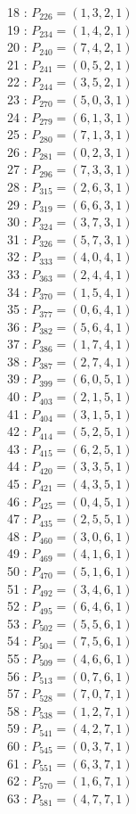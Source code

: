 \documentclass{article}
\begin{document}
{\begin{multicols}{2}
18 : $P_{226}=( 1, 3, 2, 1 )$\\
19 : $P_{234}=( 1, 4, 2, 1 )$\\
20 : $P_{240}=( 7, 4, 2, 1 )$\\
21 : $P_{241}=( 0, 5, 2, 1 )$\\
22 : $P_{244}=( 3, 5, 2, 1 )$\\
23 : $P_{270}=( 5, 0, 3, 1 )$\\
24 : $P_{279}=( 6, 1, 3, 1 )$\\
25 : $P_{280}=( 7, 1, 3, 1 )$\\
26 : $P_{281}=( 0, 2, 3, 1 )$\\
27 : $P_{296}=( 7, 3, 3, 1 )$\\
28 : $P_{315}=( 2, 6, 3, 1 )$\\
29 : $P_{319}=( 6, 6, 3, 1 )$\\
30 : $P_{324}=( 3, 7, 3, 1 )$\\
31 : $P_{326}=( 5, 7, 3, 1 )$\\
32 : $P_{333}=( 4, 0, 4, 1 )$\\
33 : $P_{363}=( 2, 4, 4, 1 )$\\
34 : $P_{370}=( 1, 5, 4, 1 )$\\
35 : $P_{377}=( 0, 6, 4, 1 )$\\
36 : $P_{382}=( 5, 6, 4, 1 )$\\
37 : $P_{386}=( 1, 7, 4, 1 )$\\
38 : $P_{387}=( 2, 7, 4, 1 )$\\
39 : $P_{399}=( 6, 0, 5, 1 )$\\
40 : $P_{403}=( 2, 1, 5, 1 )$\\
41 : $P_{404}=( 3, 1, 5, 1 )$\\
42 : $P_{414}=( 5, 2, 5, 1 )$\\
43 : $P_{415}=( 6, 2, 5, 1 )$\\
44 : $P_{420}=( 3, 3, 5, 1 )$\\
45 : $P_{421}=( 4, 3, 5, 1 )$\\
46 : $P_{425}=( 0, 4, 5, 1 )$\\
47 : $P_{435}=( 2, 5, 5, 1 )$\\
48 : $P_{460}=( 3, 0, 6, 1 )$\\
49 : $P_{469}=( 4, 1, 6, 1 )$\\
50 : $P_{470}=( 5, 1, 6, 1 )$\\
51 : $P_{492}=( 3, 4, 6, 1 )$\\
52 : $P_{495}=( 6, 4, 6, 1 )$\\
53 : $P_{502}=( 5, 5, 6, 1 )$\\
54 : $P_{504}=( 7, 5, 6, 1 )$\\
55 : $P_{509}=( 4, 6, 6, 1 )$\\
56 : $P_{513}=( 0, 7, 6, 1 )$\\
57 : $P_{528}=( 7, 0, 7, 1 )$\\
58 : $P_{538}=( 1, 2, 7, 1 )$\\
59 : $P_{541}=( 4, 2, 7, 1 )$\\
60 : $P_{545}=( 0, 3, 7, 1 )$\\
61 : $P_{551}=( 6, 3, 7, 1 )$\\
62 : $P_{570}=( 1, 6, 7, 1 )$\\
63 : $P_{581}=( 4, 7, 7, 1 )$\\
\end{multicols}
}
\end{document}
